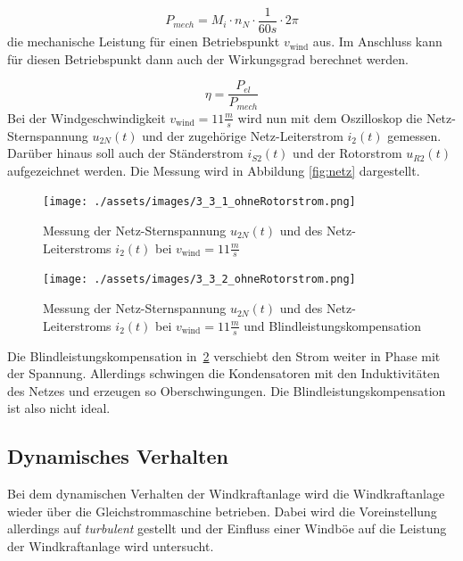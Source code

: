 \documentclass{report}
\begin{document}
\begin{equation}
	\label{eq:3}
	P_{mech} = M_{i} \cdot n_{N} \cdot \frac{1}{60s} \cdot 2\pi
\end{equation}
die mechanische Leistung für einen Betriebspunkt $v_{\mathrm{wind}}$ aus. Im Anschluss kann für diesen Betriebspunkt dann auch der Wirkungsgrad berechnet werden.

\begin{equation}
	\label{eq:2}
	\eta = \frac{P_{el}}{P_{mech}}
\end{equation}
Bei der Windgeschwindigkeit $v_{\mathrm{wind}} = 11 \frac{m}{s}$ wird nun mit dem Oszilloskop die Netz-Sternspannung $u_{2N}(t)$ und der zugehörige Netz-Leiterstrom $i_{2}(t)$ gemessen. Darüber hinaus soll auch der Ständerstrom $i_{S2}(t)$ und der Rotorstrom $u_{R2}(t)$ aufgezeichnet werden. Die Messung wird in Abbildung \ref{fig:netz} dargestellt.

\begin{figure}[!ht]
	\centering
	\texttt{[image: ./assets/images/3\_3\_1\_ohneRotorstrom.png]}
	\caption{Messung der Netz-Sternspannung $u_{2N}(t)$ und des Netz-Leiterstroms $i_{2}(t)$ bei $v_{\mathrm{wind}} = 11 \frac{m}{s}$}
	\label{fig:oszi_direkt_spannung}
\end{figure}

\begin{figure}[!ht]
	\centering
	\texttt{[image: ./assets/images/3\_3\_2\_ohneRotorstrom.png]}
	\caption{Messung der Netz-Sternspannung $u_{2N}(t)$ und des Netz-Leiterstroms $i_{2}(t)$ bei $v_{\mathrm{wind}} = 11 \frac{m}{s}$ und Blindleistungskompensation}
	\label{fig:oszi_direkt_spannung_mitKomp}
\end{figure}

Die Blindleistungskompensation in~\ref{fig:oszi_direkt_spannung_mitKomp} verschiebt den Strom weiter in Phase mit der Spannung. Allerdings schwingen die Kondensatoren mit den Induktivitäten des Netzes und erzeugen so Oberschwingungen. Die Blindleistungskompensation ist also nicht ideal.


\subsection{Dynamisches Verhalten}

Bei dem dynamischen Verhalten der Windkraftanlage wird die Windkraftanlage wieder über die Gleichstrommaschine betrieben. Dabei wird die Voreinstellung allerdings auf \textit{turbulent} gestellt und der Einfluss einer Windböe auf die Leistung der Windkraftanlage wird untersucht.
\end{document}
